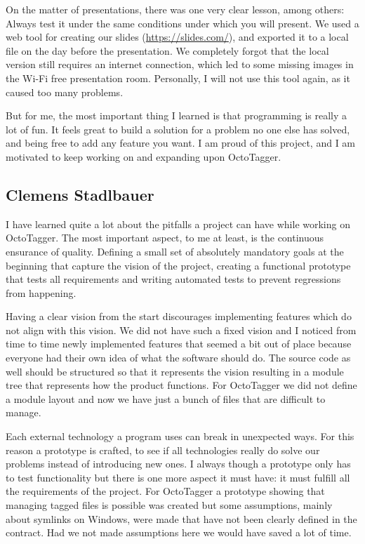 On the matter of presentations, there was one very clear lesson, among others:
Always test it under the same conditions under which you will present. We used a
web tool for creating our slides (\url{https://slides.com/}), and exported it to
a local file on the day before the presentation. We completely forgot that
the local version still requires an internet connection, which led to some
missing images in the Wi-Fi free presentation room. Personally, I will not use
this tool again, as it caused too many problems.

But for me, the most important thing I learned is that programming is really a
lot of fun. It feels great to build a solution for a problem no one else has
solved, and being free to add any feature you want. I am proud of this project,
and I am motivated to keep working on and expanding upon OctoTagger.

\subsection{Clemens Stadlbauer}

I have learned quite a lot about the pitfalls a project can have while working
on OctoTagger. The most important aspect, to me at least, is the continuous
ensurance of quality. Defining a small set of absolutely mandatory goals at the
beginning that capture the vision of the project, creating a functional
prototype that tests all requirements and writing automated tests to prevent
regressions from happening.

Having a clear vision from the start discourages implementing features which do
not align with this vision. We did not have such a fixed vision and I noticed
from time to time newly implemented features that seemed a bit out of place
because everyone had their own idea of what the software should do. The source
code as well should be structured so that it represents the vision resulting
in a module tree that represents how the product functions. For OctoTagger we
did not define a module layout and now we have just a bunch of files that are
difficult to manage.

Each external technology a program uses can break in unexpected ways. For this
reason a prototype is crafted, to see if all technologies really do solve our
problems instead of introducing new ones. I always though a prototype only has
to test functionality but there is one more aspect it must have: it must fulfill
all the requirements of the project. For OctoTagger a prototype showing that
managing tagged files is possible was created but some assumptions, mainly about
symlinks on Windows, were made that have not been clearly defined in the
contract. Had we not made assumptions here we would have saved a lot of time.

